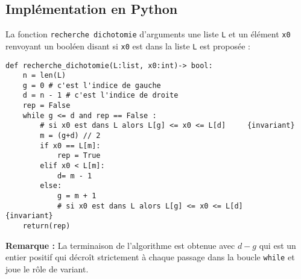  

\subsection{Implémentation en Python}


La fonction \lstinline{recherche dichotomie} d'arguments une liste \lstinline{L} et un élément \lstinline{x0} renvoyant un booléen disant si \lstinline{x0} est dans la liste \lstinline{L} est proposée :



\begin{lstlisting}
def recherche_dichotomie(L:list, x0:int)-> bool:
    n = len(L)
    g = 0 # c'est l'indice de gauche
    d = n - 1 # c'est l'indice de droite
    rep = False
    while g <= d and rep == False :
        # si x0 est dans L alors L[g] <= x0 <= L[d]     {invariant}
        m = (g+d) // 2 
        if x0 == L[m]:
            rep = True
        elif x0 < L[m]:
            d= m - 1
        else:
            g = m + 1
            # si x0 est dans L alors L[g] <= x0 <= L[d]     {invariant}
    return(rep)
\end{lstlisting} 



\textbf{Remarque :} La terminaison de l'algorithme est obtenue avec $d-g$ qui est un entier positif qui décro\^{i}t strictement à chaque passage dans la boucle \lstinline{while} et joue le rôle de variant.


